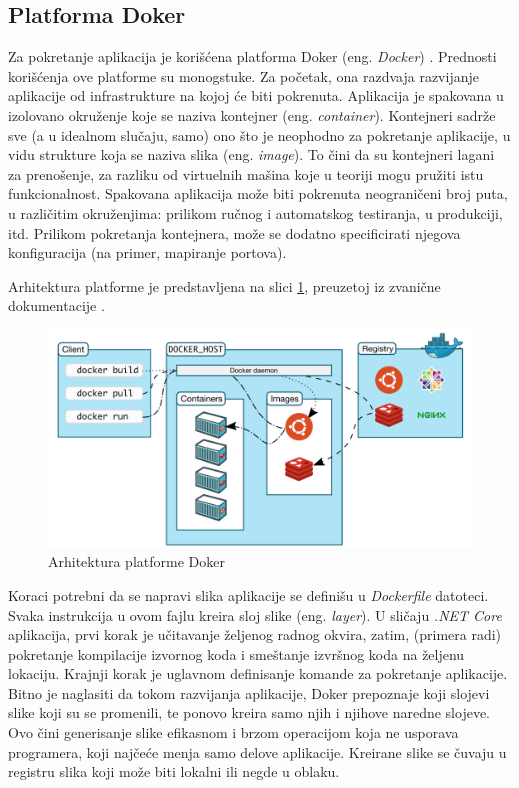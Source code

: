 \documentclass[12pt,oneside]{memoir}
\begin{document}
\subsection{Platforma Doker}
Za pokretanje aplikacija je korišćena platforma Doker (eng. \emph{Docker}) \cite{Docker}. Prednosti korišćenja ove platforme su monogstuke. Za početak, ona razdvaja razvijanje aplikacije od infrastrukture na kojoj će biti pokrenuta. Aplikacija je spakovana u izolovano okruženje koje se naziva kontejner (eng. \emph{container}). Kontejneri sadrže sve (a u idealnom slučaju, samo) ono što je neophodno za pokretanje aplikacije, u vidu strukture koja se naziva slika (eng. \emph{image}). To čini da su kontejneri lagani za prenošenje, za razliku od virtuelnih mašina koje u teoriji mogu pružiti istu funkcionalnost. Spakovana aplikacija može biti pokrenuta neograničeni broj puta, u različitim okruženjima: prilikom ručnog i automatskog testiranja, u produkciji, itd. Prilikom pokretanja kontejnera, može se dodatno specificirati njegova konfiguracija (na primer, mapiranje portova).

Arhitektura platforme je predstavljena na slici \ref{fig:dockerarch}, preuzetoj iz zvanične dokumentacije \cite{DockerArch}. 

\begin{figure}[!ht]
  \centering
  \includegraphics[width=1.0\textwidth]{./images/docker_architecture.png}
  \caption{Arhitektura platforme Doker}
  \label{fig:dockerarch}
\end{figure}

Koraci potrebni da se napravi slika aplikacije se definišu u \emph{Dockerfile} datoteci. Svaka instrukcija u ovom fajlu kreira sloj slike (eng. \emph{layer}). U sličaju \emph{.NET Core} aplikacija, prvi korak je učitavanje željenog radnog okvira, zatim, (primera radi) pokretanje kompilacije izvornog koda i smeštanje izvršnog koda na željenu lokaciju. Krajnji korak je uglavnom definisanje komande za pokretanje aplikacije. Bitno je naglasiti da tokom razvijanja aplikacije, Doker prepoznaje koji slojevi slike koji su se promenili, te ponovo kreira samo njih i njihove naredne slojeve. Ovo čini generisanje slike efikasnom i brzom operacijom koja ne usporava programera, koji najčeće menja samo delove aplikacije. Kreirane slike se čuvaju u registru slika koji može biti lokalni ili negde u oblaku.
\end{document}
